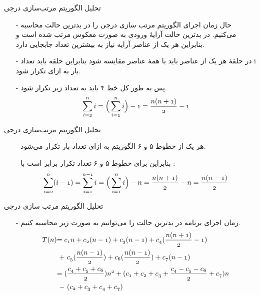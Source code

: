 \begin{frame}{‌تحلیل الگوریتم‌ مرتب‌سازی درجی}
\begin{itemize}\itemr
\item[-]
حال زمان اجرای الگوریتم مرتب سازی درجی را در بدترین حالت محاسبه می‌کنیم. در بدترین حالت آرایهٔ ورودی به صورت معکوس مرتب شده است و بنابراین هر یک از عناصر آرایه نیاز به بیشترین تعداد جابجایی دارد.
\item[-]
در حلقهٔ
هر یک از عناصر
باید با همهٔ عناصر
مقایسه شود بنابراین حلقه باید تعداد i بار به ازای
تکرار شود.
\item[-]
پس به طور کل خط ۴ باید به تعداد زیر تکرار شود.
\begin{align*}
\mathnormal{\sum_{i = 2}^{n} i = \Big(\sum_{i = 1}^{n} i \Big) - 1 = \frac{n(n+1)}{2} - 1}
\end{align*}
\end{itemize}
\end{frame}


\begin{frame}{‌تحلیل الگوریتم‌ مرتب‌سازی درجی}
\begin{itemize}\itemr
\item[-]
هر یک از خطوط ۵ و ۶ الگوریتم به ازای
تعداد
بار تکرار می‌شود.
\item[-]
بنابراین برای خطوط ۵ و ۶ تعداد تکرار برابر است با :
\begin{align*}
\mathnormal{\sum_{i = 2}^{n} (i-1) = \sum_{i = 1}^{n-1} i  = \Big(\sum_{i = 1}^{n} i \Big) - n = \frac{n(n+1)}{2}-n =  \frac{n(n-1)}{2}}
\end{align*}
\end{itemize}
\end{frame}


\begin{frame}{‌تحلیل الگوریتم‌ مرتب سازی درجی}
\begin{itemize}\itemr
\item[-]
زمان اجرای برنامه در بدترین حالت را می‌توانیم به صورت زیر محاسبه کنیم.
\begin{align*}
\mathnormal{T(n)} &\mathnormal{= c_1n + c_2(n-1) + c_3(n-1) + c_4(\frac{n(n+1)}{2} - 1)}\\
&\mathnormal{~+~c_5(\frac{n(n-1)}{2}) + c_6(\frac{n(n-1)}{2}) + c_7(n-1)}\\
&\mathnormal{= (\frac{c_4 + c_5 + c_6}{2})n^2 + (c_1 + c_2 + c_3 + \frac{c_4 - c_5 - c_6}{2} + c_7)n} \\
& \mathnormal{~-~(c_2 + c_3 + c_4 + c_7)}
\end{align*}
\end{itemize}
\end{frame}


